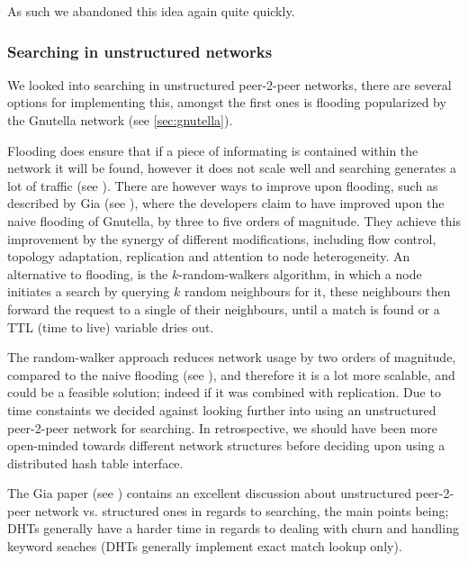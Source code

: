 As such we abandoned this idea again quite quickly.

\subsubsection{Searching in unstructured networks}
We looked into searching in unstructured peer-2-peer networks, there are
several options for implementing this, amongst the first ones is flooding
popularized by the Gnutella network (see \ref{sec:gnutella}).

Flooding does ensure that if a piece of informating is contained within the 
network it will be found, however it does not scale well and searching 
generates a lot of traffic (see \citep{Lv:Searching}).
\newline
There are however ways to improve upon flooding, such as described by Gia 
(see \citep{Chawathe:Gia}), where the developers claim to have improved upon
the naive flooding of Gnutella, by three to five orders of magnitude.
They achieve this improvement by the synergy of different modifications,
including flow control, topology adaptation, replication and attention to node
heterogeneity.
\newline\newline
An alternative to flooding, is the $k$-random-walkers algorithm, in which a 
node initiates a search by querying $k$ random neighbours for it, these
neighbours then forward the request to a single of their neighbours, until a 
match is found or a TTL (time to live) variable dries out.

The random-walker approach reduces network usage by two orders of magnitude,
compared to the naive flooding (see \citep{Lv:Searching}), and therefore it is
a lot more scalable, and could be a feasible solution; indeed if it was
combined with replication.
\newline\newline
Due to time constaints we decided against looking further into using an
unstructured peer-2-peer network for searching. In retrospective, we should
have been more open-minded towards different network structures before deciding
upon using a distributed hash table interface.

The Gia paper (see \citep{Chawathe:Gia}) contains an excellent discussion about
unstructured peer-2-peer network vs. structured ones in regards to searching,
the main points being; \acs{DHT}s generally have a harder time in regards to dealing
with churn and handling keyword seaches (\acs{DHT}s generally implement exact match
lookup only).

